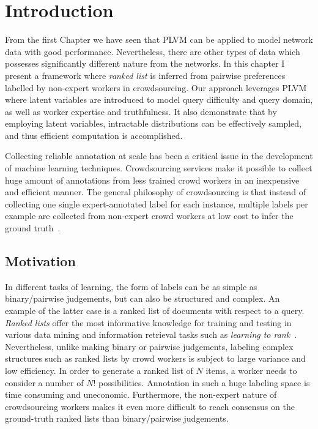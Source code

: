 \section{Introduction}

From the first Chapter we have seen that PLVM can be applied to model network
data with good performance. Nevertheless, there are other types of data which
possesses significantly different nature from the networks. In this chapter I
present a framework where \emph{ranked list} is inferred from pairwise
preferences labelled by non-expert workers in crowdsourcing. Our approach
leverages PLVM where latent variables are introduced to model query difficulty
and query domain, as well as worker expertise and truthfulness. It also
demonstrate that by employing latent variables, intractable distributions can be
effectively sampled, and thus efficient computation is accomplished.


Collecting reliable annotation at scale has been a critical issue in the
development of machine learning techniques. Crowdsourcing services make it
possible to collect huge amount of annotations from less trained crowd workers
in an inexpensive and efficient manner. The general philosophy of crowdsourcing
is that instead of collecting one single expert-annotated label for each
instance, multiple labels per example are collected from non-expert crowd
workers at low cost to infer the ground
truth~\cite{welinder2010multidimensional,whitehill2009whose}.

\subsection{Motivation}

In different tasks of learning, the form of labels can
be as simple as binary/pairwise judgements, but can also be structured and
complex.  An example of the latter case is a ranked list of documents with
respect to a query. \emph{Ranked lists} offer the most informative knowledge for
training and testing in various data mining and information retrieval tasks such
as \emph{learning to rank}~\cite{valizadegan2009learning,yue2007support}.
Nevertheless, unlike making binary or pairwise judgements, labeling complex
structures such as ranked lists by crowd workers is subject to large variance
and low efficiency. In order to generate a ranked list of $N$ items, a worker
needs to consider a number of $N!$ possibilities. Annotation in such a huge
labeling space is time consuming and uneconomic. Furthermore, the non-expert
nature of crowdsourcing workers makes it even more difficult to reach  consensus
on the ground-truth ranked lists than binary/pairwise judgements.

